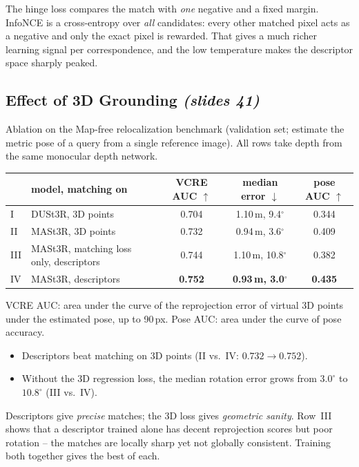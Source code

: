 \documentclass[11pt,a4paper]{article}
\newcommand{\slr}[1]{\texorpdfstring{\emph{(slides #1)}}{(slides #1)}}
\theoremstyle{definition}
\theoremstyle{plain}
\theoremstyle{remark}
\begin{document}
\begin{intuition}
The hinge loss compares the match with \emph{one} negative and a fixed margin. InfoNCE is a cross-entropy over \emph{all} candidates: every other matched pixel acts as a negative and only the exact pixel is rewarded. That gives a much richer learning signal per correspondence, and the low temperature makes the descriptor space sharply peaked.
\end{intuition}

\subsection{Effect of 3D Grounding \slr{41}}
Ablation on the Map-free relocalization benchmark (validation set; estimate the metric pose of a query from a single reference image). All rows take depth from the same monocular depth network.
\begin{center}\small
\begin{tabular}{@{}llccc@{}}\toprule
 & model, matching on & VCRE AUC $\uparrow$ & median error $\downarrow$ & pose AUC $\uparrow$\\\midrule
I & DUSt3R, 3D points & 0.704 & 1.10\,m, 9.4$^\circ$ & 0.344\\
II & MASt3R, 3D points & 0.732 & 0.94\,m, 3.6$^\circ$ & 0.409\\
III & MASt3R, matching loss only, descriptors & 0.744 & 1.10\,m, 10.8$^\circ$ & 0.382\\
IV & MASt3R, descriptors & \textbf{0.752} & \textbf{0.93\,m, 3.0$^\circ$} & \textbf{0.435}\\\bottomrule
\end{tabular}
\end{center}
VCRE AUC: area under the curve of the reprojection error of virtual 3D points under the estimated pose, up to 90\,px. Pose AUC: area under the curve of pose accuracy.
\begin{itemize}
\item Descriptors beat matching on 3D points (II vs.\ IV: $0.732\to0.752$).
\item Without the 3D regression loss, the median rotation error grows from $3.0^\circ$ to $10.8^\circ$ (III vs.\ IV).
\end{itemize}
\begin{intuition}
Descriptors give \emph{precise} matches; the 3D loss gives \emph{geometric sanity}. Row~III shows that a descriptor trained alone has decent reprojection scores but poor rotation -- the matches are locally sharp yet not globally consistent. Training both together gives the best of each.
\end{intuition}
\end{document}
